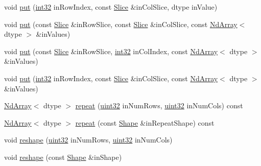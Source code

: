 \begin{DoxyCompactItemize}
\item 
void \mbox{\hyperlink{class_num_cpp_1_1_nd_array_a17a6048dc96ca3440fbd28779333e845}{put}} (\mbox{\hyperlink{namespace_num_cpp_acf3eb1592f8b248ff0a236634864633c}{int32}} in\+Row\+Index, const \mbox{\hyperlink{class_num_cpp_1_1_slice}{Slice}} \&in\+Col\+Slice, dtype in\+Value)
\item 
void \mbox{\hyperlink{class_num_cpp_1_1_nd_array_aa9becf7c44d2dba2fcfd0d728c7a66f5}{put}} (const \mbox{\hyperlink{class_num_cpp_1_1_slice}{Slice}} \&in\+Row\+Slice, const \mbox{\hyperlink{class_num_cpp_1_1_slice}{Slice}} \&in\+Col\+Slice, const \mbox{\hyperlink{class_num_cpp_1_1_nd_array}{Nd\+Array}}$<$ dtype $>$ \&in\+Values)
\item 
void \mbox{\hyperlink{class_num_cpp_1_1_nd_array_a1d83d50f74297ad3e9b406a5fcf2708b}{put}} (const \mbox{\hyperlink{class_num_cpp_1_1_slice}{Slice}} \&in\+Row\+Slice, \mbox{\hyperlink{namespace_num_cpp_acf3eb1592f8b248ff0a236634864633c}{int32}} in\+Col\+Index, const \mbox{\hyperlink{class_num_cpp_1_1_nd_array}{Nd\+Array}}$<$ dtype $>$ \&in\+Values)
\item 
void \mbox{\hyperlink{class_num_cpp_1_1_nd_array_a0b9d3be59b94cd0844e66e5ad244910d}{put}} (\mbox{\hyperlink{namespace_num_cpp_acf3eb1592f8b248ff0a236634864633c}{int32}} in\+Row\+Index, const \mbox{\hyperlink{class_num_cpp_1_1_slice}{Slice}} \&in\+Col\+Slice, const \mbox{\hyperlink{class_num_cpp_1_1_nd_array}{Nd\+Array}}$<$ dtype $>$ \&in\+Values)
\item 
\mbox{\hyperlink{class_num_cpp_1_1_nd_array}{Nd\+Array}}$<$ dtype $>$ \mbox{\hyperlink{class_num_cpp_1_1_nd_array_a0a707b9a65e7d6c817e2b8318dcce15c}{repeat}} (\mbox{\hyperlink{namespace_num_cpp_a36f388e948380413c63011cab9b7fbd5}{uint32}} in\+Num\+Rows, \mbox{\hyperlink{namespace_num_cpp_a36f388e948380413c63011cab9b7fbd5}{uint32}} in\+Num\+Cols) const
\item 
\mbox{\hyperlink{class_num_cpp_1_1_nd_array}{Nd\+Array}}$<$ dtype $>$ \mbox{\hyperlink{class_num_cpp_1_1_nd_array_aaec180affbe1c55911a53bce2667e17e}{repeat}} (const \mbox{\hyperlink{class_num_cpp_1_1_shape}{Shape}} \&in\+Repeat\+Shape) const
\item 
void \mbox{\hyperlink{class_num_cpp_1_1_nd_array_a3693817306a5eb45321cc922d7fc9d4c}{reshape}} (\mbox{\hyperlink{namespace_num_cpp_a36f388e948380413c63011cab9b7fbd5}{uint32}} in\+Num\+Rows, \mbox{\hyperlink{namespace_num_cpp_a36f388e948380413c63011cab9b7fbd5}{uint32}} in\+Num\+Cols)
\item 
void \mbox{\hyperlink{class_num_cpp_1_1_nd_array_a13b99166ade55b455abf4b2112d246bc}{reshape}} (const \mbox{\hyperlink{class_num_cpp_1_1_shape}{Shape}} \&in\+Shape)

\end{DoxyCompactItemize}
